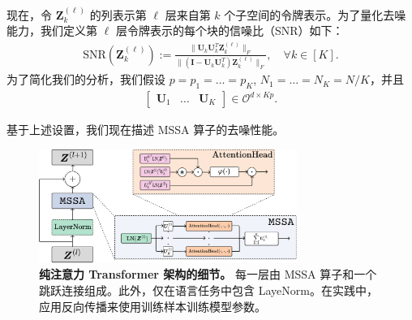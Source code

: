 \documentclass[../../book-main.tex]{subfiles}
\begin{document}
现在，令 $\bm Z_k^{(\ell)}$ 的列表示第 $\ell$ 层来自第 $k$ 个子空间的令牌表示。为了量化去噪能力，我们定义第 $\ell$ 层令牌表示的每个块的信噪比（SNR）如下：
\begin{align}\label{def:SNR}
\mathrm{SNR}(\bm Z_k^{(\ell)}) :=  \frac{\|\bm U_k\bm U_k^T\bm Z_k^{(\ell)} \|_F}{\|(\bm I - \bm U_k\bm U_k^T)\bm Z_k^{(\ell)} \|_F},\quad \forall k \in [K].
\end{align}
为了简化我们的分析，我们假设 $p=p_1=\dots=p_K$, $N_1=\dots=N_K=N/K$，并且
\begin{align}\label{eq:orth}
\begin{bmatrix}
\bm U_1 & \dots & \bm U_K
\end{bmatrix} \in \mathcal{O}^{d\times Kp}.
\end{align}

基于上述设置，我们现在描述 MSSA 算子的去噪性能。

\begin{figure}[t]
\begin{center}
        \includegraphics[width=0.75\textwidth]{figs_chap4/MSSA.png}
    \caption{\textbf{纯注意力 Transformer 架构的细节。} 每一层由 MSSA 算子和一个跳跃连接组成。此外，仅在语言任务中包含 LayeNorm。在实践中，应用反向传播来使用训练样本训练模型参数。 %
    }\label{fig:transformer}
\end{center}
\end{figure}
\end{document}
